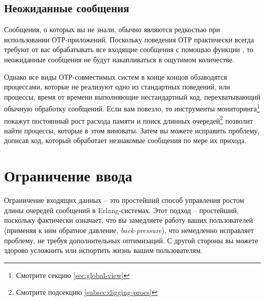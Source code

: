 \documentclass[11pt, oneside]{book}   	%
\begin{document}
\subsection{Неожиданные сообщения}

Сообщения, о которых вы не знали, обычно являются редкостью при использовании ОТР-приложений. Поскольку поведения ОТР практически всегда требуют от вас обрабатывать все входящие сообщения с помощью функции , то неожиданные сообщения не будут накапливаться в ощутимом количестве.

Однако все виды ОТР-совместимых систем в конце концов обзаводятся процессами, которые не реализуют одно из стандартных поведений, или процессы, время от времени выполняющие нестандартный код, перехватывающий обычную обработку сообщений. Если вам повезло, то инструменты мониторинга\footnote{Смотрите секцию \ref{sec:global-view}} покажут постоянный рост расхода памяти и поиск длинных очередей\footnote{Смотрите подсекцию \ref{subsec:digging-procs}} позволит найти процессы, которые в этом виноваты. Затем вы можете исправить проблему, дописав код, который обработает незнакомые сообщения по мере их прихода.


\section{Ограничение ввода}

Ограничение входящих данных -- это простейший способ управления ростом длины очередей сообщений в Erlang-системах. Этот подход -- простейший, поскольку фактически означает, что вы замедляете работу ваших пользователей (применяя к ним обратное давление, \emph{back-pressure}), что немедленно исправляет проблему, не требуя дополнительных оптимизаций. С другой стороны вы можете здорово усложнить или испортить жизнь вашим пользователям.
\end{document}
